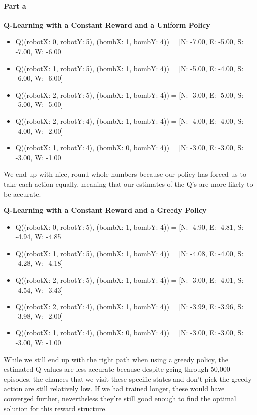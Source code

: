 \documentclass[12pt]{article}
\begin{document}
\paragraph{Part a}

\textbf{Q-Learning with a Constant Reward and a Uniform Policy}
\begin{itemize}
  \item Q((robotX: 0, robotY: 5), (bombX: 1, bombY: 4)) = [N: -7.00, E: -5.00, S: -7.00, W: -6.00]
  \item Q((robotX: 1, robotY: 5), (bombX: 1, bombY: 4)) = [N: -5.00, E: -4.00, S: -6.00, W: -6.00]
  \item Q((robotX: 2, robotY: 5), (bombX: 1, bombY: 4)) = [N: -3.00, E: -5.00, S: -5.00, W: -5.00]
  \item Q((robotX: 2, robotY: 4), (bombX: 1, bombY: 4)) = [N: -4.00, E: -4.00, S: -4.00, W: -2.00]
  \item Q((robotX: 1, robotY: 4), (bombX: 0, bombY: 4)) = [N: -3.00, E: -3.00, S: -3.00, W: -1.00]
\end{itemize}

We end up with nice, round whole numbers because our policy has forced us to take each action equally, meaning that our estimates of the Q's are more likely to be accurate.

\textbf{Q-Learning with a Constant Reward and a Greedy Policy}
\begin{itemize}
  \item Q((robotX: 0, robotY: 5), (bombX: 1, bombY: 4)) = [N: -4.90, E: -4.81, S: -4.94, W: -4.85]
  \item Q((robotX: 1, robotY: 5), (bombX: 1, bombY: 4)) = [N: -4.08, E: -4.00, S: -4.28, W: -4.18]
  \item Q((robotX: 2, robotY: 5), (bombX: 1, bombY: 4)) = [N: -3.00, E: -4.01, S: -4.54, W: -3.43]
  \item Q((robotX: 2, robotY: 4), (bombX: 1, bombY: 4)) = [N: -3.99, E: -3.96, S: -3.98, W: -2.00]
  \item Q((robotX: 1, robotY: 4), (bombX: 0, bombY: 4)) = [N: -3.00, E: -3.00, S: -3.00, W: -1.00]
\end{itemize}

While we still end up with the right path when using a greedy policy, the estimated Q values are less accurate because despite going through 50,000 episodes, the chances that we visit these specific states and don't pick the greedy action are still relatively low. If we had trained longer, these would have converged further, nevertheless they're still good enough to find the optimal solution for this reward structure.
\end{document}
